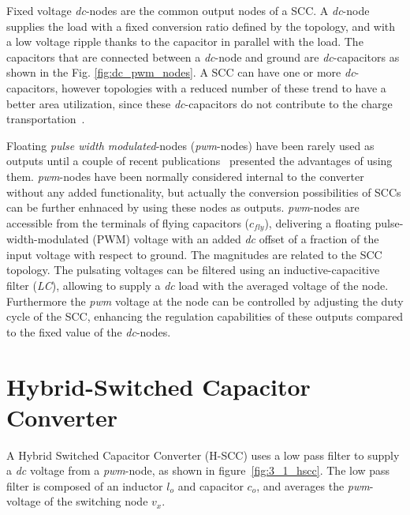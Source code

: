 Fixed voltage \emph{dc}-nodes are the common output nodes of a SCC. A \emph{dc}-node supplies the load with a fixed conversion ratio defined by the topology, and  with a low voltage ripple thanks to the capacitor in parallel with the load. The capacitors that are connected between a \emph{dc}-node and ground are  \emph{dc}-capacitors as shown in the Fig. \ref{fig:dc_pwm_nodes}. A SCC can have one or more \emph{dc}-capacitors, however topologies with a reduced number of these trend to have a better area utilization, since these \emph{dc}-capacitors do not contribute to the charge transportation~\cite{Seeman:EECS-2009-78}.

Floating \emph{pulse width modulated}-nodes (\emph{pwm}-nodes) have been rarely used as outputs until a couple of recent publications~\cite{2012Kumar, 2012Kline} presented the advantages of using them. \emph{pwm}-nodes have been normally considered  internal to the converter without any added functionality, but actually the conversion possibilities of SCCs can be further enhnaced by using these nodes as outputs.
\emph{pwm}-nodes are accessible from the terminals of flying capacitors ($c_{fly}$), delivering a floating pulse-width-modulated (PWM) voltage with an added \emph{dc} offset of a fraction of the input voltage with respect to ground. The magnitudes are related to the SCC topology. The pulsating voltages can be filtered using an inductive-capacitive filter (\emph{LC}), allowing to supply a \emph{dc} load with the averaged voltage of the node. Furthermore the \emph{pwm} voltage at the node can be controlled by adjusting the duty
cycle of the SCC, enhancing the regulation capabilities of these outputs compared to the fixed value of the \emph{dc}-nodes.

\section{Hybrid-Switched Capacitor Converter}
A Hybrid Switched Capacitor Converter (H-SCC) uses a low pass filter to supply a \emph{dc} voltage from a \emph{pwm}-node, as shown in figure~\ref{fig:3_1_hscc}. The low pass filter is composed of an inductor $l_o$ and capacitor $c_o$, and averages the \emph{pwm}-voltage of the switching node $v_x$.

